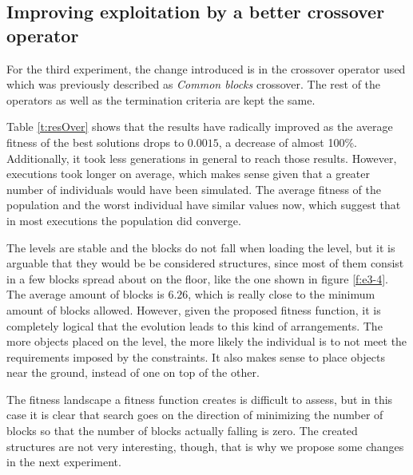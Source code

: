 \documentclass[runningheads,a4paper]{llncs}
\begin{document}
\subsection{Improving exploitation by a better crossover operator}\label{E3}


For the third experiment, the change introduced is in the crossover operator 
used which was previously described as \textit{Common blocks} crossover. 
The rest of the operators as 
well as the termination criteria are kept the same. 

Table \ref{t:resOver} shows that the results have radically improved as the 
average fitness of the best solutions drops to $0.0015$, a decrease of almost 
100\%. Additionally, it took less generations in general to reach those 
results. However, executions took longer on average, which makes sense given 
that a greater number of individuals would have been simulated. The average 
fitness of the population and the worst individual have similar values now, 
which suggest that in most executions the population did converge.

The levels are stable and the blocks do not fall when loading the level, but 
it is arguable that they would be be considered structures, since most of them consist in a 
few blocks spread about on the floor, like the one shown in figure \ref{f:e3-4}.
The average amount of blocks is $6.26$, 
which is really close to the minimum amount of blocks allowed. However, given 
the proposed fitness function, it is completely logical that the evolution 
leads to this kind of arrangements. The more objects placed on the level, the 
more likely the individual is to not meet the requirements imposed by the 
constraints. It also makes sense to place objects near the ground, instead of 
one on top of the other.

The fitness landscape a fitness function creates is difficult to
assess, but in this case it is clear that search goes on the direction
of minimizing the number of blocks so that the number of blocks
actually falling is zero. The created structures are not very
interesting, though, that is why we propose some changes in the next experiment.
\end{document}
